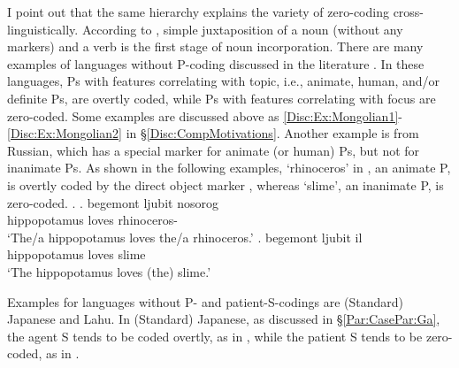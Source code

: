I point out that the same hierarchy \Last explains the variety of zero-coding cross-linguistically.
According to ,
simple juxtaposition of a noun (without any markers) and a verb is the first stage of noun incorporation.
There are many examples of languages without P-coding discussed in the literature
\cite[]{comrie79,comrie83,croft03,aissen03,haspelmath08}.
In these languages,
Ps with features correlating with topic,
i.e.,  animate, human, and/or definite Ps,
are overtly coded,
while Ps with features correlating with focus
are zero-coded.
Some examples are discussed above as \ref{Disc:Ex:Mongolian1}-\ref{Disc:Ex:Mongolian2} in \S \ref{Disc:CompMotivations}.
Another example is from Russian,
which has a special marker for animate (or human) Ps,
but not for inanimate Ps.
As shown in the following examples,
 `rhinoceros' in \Next[a], an animate P,
is overtly coded by the direct object marker ,
whereas  `slime', an inanimate P,
is zero-coded.
%
\ex.
 \ag. begemont ljubit nosorog \\
      hippopotamus loves rhinoceros- \\
      `The/a hippopotamus loves the/a rhinoceros.'
 \bg. begemont ljubit il \\
      hippopotamus loves slime \\
      `The hippopotamus loves (the) slime.'

Examples for languages without P- and patient-S-codings are (Standard) Japanese and Lahu.
In (Standard) Japanese,
as discussed in \S \ref{Par:CasePar:Ga},
the agent S tends to be coded overtly, as in \Next[a],
while the patient S tends to be zero-coded, as in \Next[b-c]
\cite[93]{kageyama93}.

